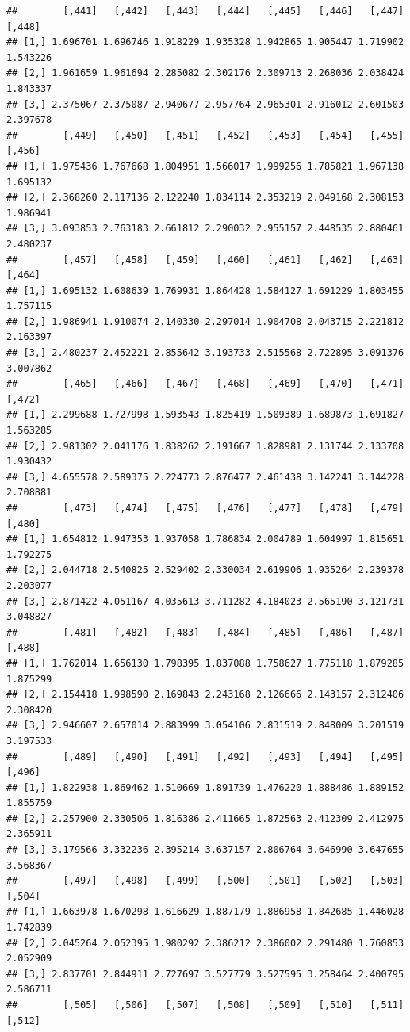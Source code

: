 \documentclass[article]{jss}\usepackage[]{graphicx}\usepackage[]{xcolor}
\makeatletter
\newenvironment{kframe}{%
 \def\at@end@of@kframe{}%
 \ifinner\ifhmode%
  \def\at@end@of@kframe{\end{minipage}}%
  \begin{minipage}{\columnwidth}%
 \fi\fi%
 \def\FrameCommand##1{\hskip\@totalleftmargin \hskip-\fboxsep
 \colorbox{shadecolor}{##1}\hskip-\fboxsep
     \hskip-\linewidth \hskip-\@totalleftmargin \hskip\columnwidth}%
 \MakeFramed {\advance\hsize-\width
   \@totalleftmargin\z@ \linewidth\hsize
   \@setminipage}}%
 {\par\unskip\endMakeFramed%
 \at@end@of@kframe}
\newenvironment{knitrout}{}{} %
\makeatother
\begin{document}
\begin{knitrout}
\begin{kframe}
\begin{verbatim}
##        [,441]   [,442]   [,443]   [,444]   [,445]   [,446]   [,447]   [,448]
## [1,] 1.696701 1.696746 1.918229 1.935328 1.942865 1.905447 1.719902 1.543226
## [2,] 1.961659 1.961694 2.285082 2.302176 2.309713 2.268036 2.038424 1.843337
## [3,] 2.375067 2.375087 2.940677 2.957764 2.965301 2.916012 2.601503 2.397678
##        [,449]   [,450]   [,451]   [,452]   [,453]   [,454]   [,455]   [,456]
## [1,] 1.975436 1.767668 1.804951 1.566017 1.999256 1.785821 1.967138 1.695132
## [2,] 2.368260 2.117136 2.122240 1.834114 2.353219 2.049168 2.308153 1.986941
## [3,] 3.093853 2.763183 2.661812 2.290032 2.955157 2.448535 2.880461 2.480237
##        [,457]   [,458]   [,459]   [,460]   [,461]   [,462]   [,463]   [,464]
## [1,] 1.695132 1.608639 1.769931 1.864428 1.584127 1.691229 1.803455 1.757115
## [2,] 1.986941 1.910074 2.140330 2.297014 1.904708 2.043715 2.221812 2.163397
## [3,] 2.480237 2.452221 2.855642 3.193733 2.515568 2.722895 3.091376 3.007862
##        [,465]   [,466]   [,467]   [,468]   [,469]   [,470]   [,471]   [,472]
## [1,] 2.299688 1.727998 1.593543 1.825419 1.509389 1.689873 1.691827 1.563285
## [2,] 2.981302 2.041176 1.838262 2.191667 1.828981 2.131744 2.133708 1.930432
## [3,] 4.655578 2.589375 2.224773 2.876477 2.461438 3.142241 3.144228 2.708881
##        [,473]   [,474]   [,475]   [,476]   [,477]   [,478]   [,479]   [,480]
## [1,] 1.654812 1.947353 1.937058 1.786834 2.004789 1.604997 1.815651 1.792275
## [2,] 2.044718 2.540825 2.529402 2.330034 2.619906 1.935264 2.239378 2.203077
## [3,] 2.871422 4.051167 4.035613 3.711282 4.184023 2.565190 3.121731 3.048827
##        [,481]   [,482]   [,483]   [,484]   [,485]   [,486]   [,487]   [,488]
## [1,] 1.762014 1.656130 1.798395 1.837088 1.758627 1.775118 1.879285 1.875299
## [2,] 2.154418 1.998590 2.169843 2.243168 2.126666 2.143157 2.312406 2.308420
## [3,] 2.946607 2.657014 2.883999 3.054106 2.831519 2.848009 3.201519 3.197533
##        [,489]   [,490]   [,491]   [,492]   [,493]   [,494]   [,495]   [,496]
## [1,] 1.822938 1.869462 1.510669 1.891739 1.476220 1.888486 1.889152 1.855759
## [2,] 2.257900 2.330506 1.816386 2.411665 1.872563 2.412309 2.412975 2.365911
## [3,] 3.179566 3.332236 2.395214 3.637157 2.806764 3.646990 3.647655 3.568367
##        [,497]   [,498]   [,499]   [,500]   [,501]   [,502]   [,503]   [,504]
## [1,] 1.663978 1.670298 1.616629 1.887179 1.886958 1.842685 1.446028 1.742839
## [2,] 2.045264 2.052395 1.980292 2.386212 2.386002 2.291480 1.760853 2.052909
## [3,] 2.837701 2.844911 2.727697 3.527779 3.527595 3.258464 2.400795 2.586711
##        [,505]   [,506]   [,507]   [,508]   [,509]   [,510]   [,511]   [,512]

\end{verbatim}
\end{kframe}
\end{knitrout}
\end{document}

